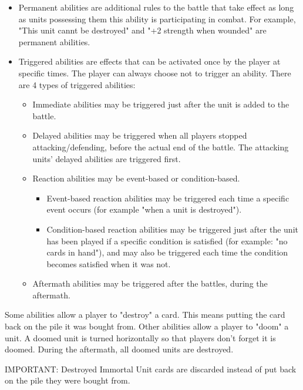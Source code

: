 \documentclass[a4paper]{article}
\begin{document}
    \begin{itemize}
        \item Permanent abilities are additional rules to the battle that take effect as long
            as units possessing them this ability is participating in combat.
            For example, "This unit cannt be destroyed" and "+2 strength when wounded" are permanent abilities.
        \item Triggered abilities are effects that can be activated once by the player at specific times.
            The player can always choose not to trigger an ability.
            There are 4 types of triggered abilities:
            \begin{itemize}
        	        \item Immediate abilities may be triggered just after the unit is added to the battle.
        	        \item Delayed abilities may be triggered when all players stopped attacking/defending,
	            before the actual end of the battle. The attacking units' delayed abilities are triggered first.
        	        \item Reaction abilities may be event-based or condition-based.
	            \begin{itemize}
                        \item Event-based reaction abilities may be triggered each time a specific event occurs
                            (for example "when a unit is destroyed").
                        \item Condition-based reaction abilities may be triggered just after the unit has been played
                            if a specific condition is satisfied (for example: "no cards in hand"), and may also be triggered
                            each time the condition becomes satisfied when it was not.
                    \end{itemize}
        	        \item Aftermath abilities may be triggered after the battles, during the aftermath.
            \end{itemize}
    \end{itemize}

    Some abilities allow a player to "destroy" a card.
    This means putting the card back on the pile it was bought from.
    Other abilities allow a player to "doom" a unit.
    A doomed unit is turned horizontally so that players don't forget it is doomed.
    During the aftermath, all doomed units are destroyed.
    
    IMPORTANT: Destroyed Immortal Unit cards are discarded instead of put back on the pile they were bought from.
\end{document}

